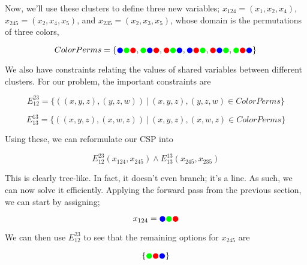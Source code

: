Now, we'll use these clusters to define three new variables; $x_{124} = (x_1, x_2, x_4)$, $x_{245} = (x_2, x_4, x_5)$, and $x_{235} = (x_2, x_3, x_5)$, whose domain is the permutations of three colors,

\begin{equation}
    ColorPerms =
    \{{\color{blue}\CIRCLE} {\color{green}\CIRCLE} {\color{red}\CIRCLE}, 
    {\color{green}\CIRCLE} {\color{blue}\CIRCLE} {\color{red}\CIRCLE},
    {\color{red}\CIRCLE} {\color{green}\CIRCLE} {\color{blue}\CIRCLE},
    {\color{blue}\CIRCLE} {\color{red}\CIRCLE} {\color{green}\CIRCLE}, 
    {\color{red}\CIRCLE} {\color{blue}\CIRCLE} {\color{green}\CIRCLE},
    {\color{green}\CIRCLE} {\color{red}\CIRCLE} {\color{blue}\CIRCLE}
    \}
\end{equation}

We also have constraints relating the values of shared variables between different clusters. For our problem, the important constraints are

\begin{equation}
    E^{23}_{12} = \{((x, y, z), (y, z, w))\ |\ (x, y, z), (y, z, w) \in ColorPerms\}
\end{equation}

\begin{equation}
    E^{13}_{13} = \{((x, y, z), (x, w, z))\ |\ (x, y, z), (x, w, z) \in ColorPerms\}
\end{equation}

Using these, we can reformulate our CSP into

\begin{equation}
    E^{23}_{12}(x_{124}, x_{245}) \wedge E^{13}_{13}(x_{245}, x_{235})
\end{equation}

This is clearly tree-like. In fact, it doesn't even branch; it's a line. As such, we can now solve it efficiently. Applying the forward pass from the previous section, we can start by assigning;

\begin{equation}
    x_{124} = {\color{blue}\CIRCLE} {\color{green}\CIRCLE} {\color{red}\CIRCLE}
\end{equation}

We can then use $E^{23}_{12}$ to see that the remaining options for $x_{245}$ are

\begin{equation}
    \{{\color{green}\CIRCLE} {\color{red}\CIRCLE} {\color{blue}\CIRCLE}
    \}
\end{equation}

